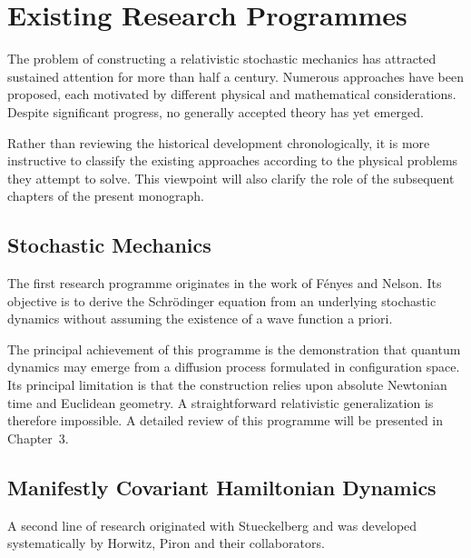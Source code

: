 \section{Existing Research Programmes}
The problem of constructing a relativistic stochastic mechanics has
attracted sustained attention for more than half a century. Numerous
approaches have been proposed, each motivated by different physical and
mathematical considerations. Despite significant progress, no generally
accepted theory has yet emerged.

Rather than reviewing the historical development chronologically, it is
more instructive to classify the existing approaches according to the
physical problems they attempt to solve. This viewpoint will also
clarify the role of the subsequent chapters of the present monograph.
\subsection{Stochastic Mechanics}
The first research programme originates in the work of Fényes and
Nelson. Its objective is to derive the Schrödinger equation from an
underlying stochastic dynamics without assuming the existence of a wave
function a priori.

The principal achievement of this programme is the demonstration that
quantum dynamics may emerge from a diffusion process formulated in
configuration space.
Its principal limitation is that the construction relies upon absolute
Newtonian time and Euclidean geometry. A straightforward relativistic
generalization is therefore impossible.
A detailed review of this programme will be presented in Chapter~3.
\subsection{Manifestly Covariant Hamiltonian Dynamics}
A second line of research originated with Stueckelberg and was developed
systematically by Horwitz, Piron and their collaborators.

